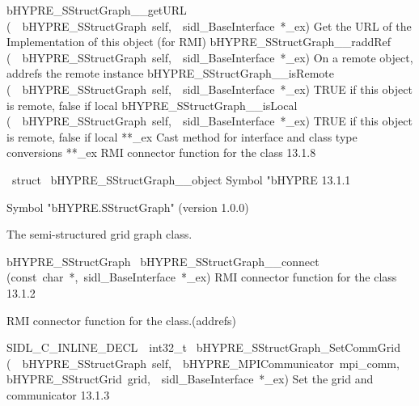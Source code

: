 \documentclass{article}
\begin{document}
\begin{cxxentry}
\begin{cxxentry}
\begin{cxxnames}
        {bHYPRE\_SStructGraph\_\_getURL}
        {(\ \ bHYPRE\_SStructGraph\ self,\ \ sidl\_BaseInterface\ *\_ex)}
        {
Get the URL of the Implementation of this object (for RMI)}
        {}
\label{cxx.13.1.19}
        {bHYPRE\_SStructGraph\_\_raddRef}
        {(\ \ bHYPRE\_SStructGraph\ self,\ \ sidl\_BaseInterface\ *\_ex)}
        {
On a remote object, addrefs the remote instance}
        {}
\label{cxx.13.1.20}
        {bHYPRE\_SStructGraph\_\_isRemote}
        {(\ \ bHYPRE\_SStructGraph\ self,\ \ sidl\_BaseInterface\ *\_ex)}
        {
TRUE if this object is remote, false if local}
        {}
\label{cxx.13.1.21}
        {bHYPRE\_SStructGraph\_\_isLocal}
        {(\ \ bHYPRE\_SStructGraph\ self,\ \ sidl\_BaseInterface\ *\_ex)}
        {
TRUE if this object is remote, false if local}
        {}
\label{cxx.13.1.22}
        {**\_ex}
        {}
        {
Cast method for interface and class type conversions}
        {}
\label{cxx.13.1.23}
        {**\_ex}
        {}
        {
RMI connector function for the class}
        {13.1.8}
\end{cxxnames}
\begin{cxxvariable}
{\ struct\ }
        {bHYPRE\_SStructGraph\_\_object}
        {}
        {
Symbol "bHYPRE}
        {13.1.1}
\begin{cxxdoc}

Symbol "bHYPRE.SStructGraph" (version 1.0.0)

The semi-structured grid graph class.
\end{cxxdoc}
\end{cxxvariable}
\begin{cxxfunction}
{bHYPRE\_SStructGraph\ }
        {bHYPRE\_SStructGraph\_\_connect}
        {(const\ char\ *,\ sidl\_BaseInterface\ *\_ex)}
        {
RMI connector function for the class}
        {13.1.2}
\begin{cxxdoc}

RMI connector function for the class.(addrefs)
\end{cxxdoc}
\end{cxxfunction}
\begin{cxxfunction}
{SIDL\_C\_INLINE\_DECL\ \ int32\_t\ }
        {bHYPRE\_SStructGraph\_SetCommGrid}
        {(\ \ bHYPRE\_SStructGraph\ self,\ \ bHYPRE\_MPICommunicator\ mpi\_comm,\ \ bHYPRE\_SStructGrid\ grid,\ \ sidl\_BaseInterface\ *\_ex)}
        {
Set the grid and communicator}
        {13.1.3}
\begin{cxxdoc}


\end{cxxdoc}
\end{cxxfunction}
\end{cxxentry}
\end{cxxentry}
\end{document}
